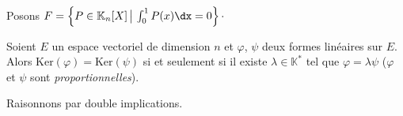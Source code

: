 \documentclass[a4paper,10pt]{report}
\begin{document}
\begin{Demonstration}{}
\vspace{12cm}

\newpage

\phantom{9cm}

\vspace{9cm}
\end{Demonstration}

\begin{Exemple} Posons $F = \left\lbrace P \in \mathbb{K}_n[X] \, \big{\vert} \, \int_{0}^1 P(x) \dx =0\right\rbrace \cdot$


\vspace{5cm}
\end{Exemple}

\begin{Proposition}{} Soient $E$ un espace vectoriel de dimension $n$ et $\varphi$, $\psi$ deux formes linéaires sur $E$. Alors $\textrm{Ker}(\varphi) = \textrm{Ker}(\psi)$ si et seulement si il existe $\lambda \in \mathbb{K}^*$ tel que $\varphi = \lambda \psi$ ($\varphi$ et $\psi$ sont \emph{proportionnelles}).
\end{Proposition}

\begin{Demonstration}{} Raisonnons par double implications.

\vspace{11cm}
%
%
\end{Demonstration}
\end{document}
